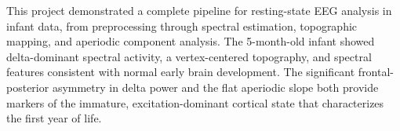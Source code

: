 \documentclass[10pt, a4paper, twocolumn]{article}
\begin{document}
This project demonstrated a complete pipeline for resting-state EEG analysis in infant data, from preprocessing through spectral estimation, topographic mapping, and aperiodic component analysis. The 5-month-old infant showed delta-dominant spectral activity, a vertex-centered topography, and spectral features consistent with normal early brain development. The significant frontal-posterior asymmetry in delta power and the flat aperiodic slope both provide markers of the immature, excitation-dominant cortical state that characterizes the first year of life.

\FloatBarrier


\end{document}
